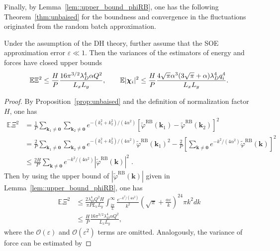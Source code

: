 Finally, by Lemma~\ref{lem::upper_bound_phiRB}, one has the following Theorem~\ref{thm:unbaised} for the boundness and convergence in the fluctuations originated from the random batch approximation.
\begin{thm}\label{thm:unbaised}
	Under the assumption of the DH theory, further assume that the SOE approximation error $\varepsilon\ll 1$. 
	Then the variances of the estimators of energy and forces have closed upper bounds
	\begin{equation}
		\mathbb{E}\Xi^2\leq \frac{H}{P}\frac{16\pi^{3/2}\lambda_D^4\alpha Q^2}{L_xL_y},\quad \quad \mathbb{E}|\boldsymbol{\chi}_{i}|^2\leq\frac{H}{P}\frac{4\sqrt{\pi}\alpha^3(3\sqrt{\pi}+\alpha)\lambda_D^4 q_{i}^4}{L_xL_y}.
	\end{equation}
\end{thm}
\begin{proof}
	By Proposition~\ref{prop:unbaised} and the definition of normalization factor $H$, one has
	\begin{equation}
		\begin{split}
			\mathbb{E}\Xi^2
			& = \frac{1}{P}\sum_{\bm{k}_1\neq \bm{0}}\sum_{\bm{k}_2\neq \bm{0}}e^{-(k_1^2+k_2^2)/(4\alpha^2)}\left[\widetilde{\varphi}^{\text{RB}}(\bm{k}_1)-\widetilde{\varphi}^{\text{RB}}(\bm{k}_2)\right]^2\\
			& = \frac{2}{P}\sum_{\bm{k}_1\neq \bm{0}}\sum_{\bm{k}_2\neq \bm{0}}e^{-(k_1^2+k_2^2)/(4\alpha^2)} \widetilde{\varphi}^{\text{RB}}(\bm{k}_1)^2 - \frac{2}{P} \left[ \sum_{\bm{k}\neq \bm{0}} e^{-k^2 /(4\alpha^2)} \widetilde{\varphi}^{\text{RB}}(\bm{k}) \right]^2\\
			& \leq \frac{2H}{P}\sum_{\bm{k}\neq\bm{0}}e^{-k^2/(4\alpha^2)}\left|\widetilde{\varphi}^{\text{RB}}(\bm{k})\right|^2\;.
		\end{split}
	\end{equation}
	Then by using the upper bound of $\left|\widetilde{\varphi}^{\text{RB}}(\bm{k})\right|$ given in Lemma~\ref{lem::upper_bound_phiRB}, one has 
	\begin{equation}
		\begin{split}
			\mathbb{E}\Xi^2&\leq \frac{2\lambda_D^4Q^2H}{\pi PL_xL_y}\int_{\frac{2\pi}{L}}^{\infty}\frac{e^{-k^2/(4\alpha^2)}}{k^2}\left(\sqrt{\pi}+\frac{\alpha \varepsilon}{k}\right)^24\pi k^2dk\\
			&\leq \frac{H}{P}\frac{16\pi^{3/2}\lambda_D^4\alpha Q^2}{L_xL_y},
		\end{split}
	\end{equation}
	where the $\mathcal{O}(\varepsilon)$ and $\mathcal{O}(\varepsilon^2)$ terms are omitted. Analogously, the variance of force can be estimated by

\end{proof}
